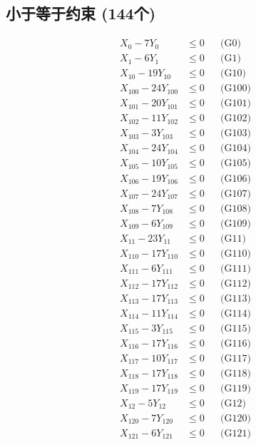 \documentclass[a4paper,10pt]{article}
\begin{document}
\subsection{小于等于约束 (144个)}

\allowdisplaybreaks
{\small\begin{align}
X_{0} - 7Y_{0} &\leq 0 && \text{(G0)} \\
X_{1} - 6Y_{1} &\leq 0 && \text{(G1)} \\
X_{10} - 19Y_{10} &\leq 0 && \text{(G10)} \\
X_{100} - 24Y_{100} &\leq 0 && \text{(G100)} \\
X_{101} - 20Y_{101} &\leq 0 && \text{(G101)} \\
X_{102} - 11Y_{102} &\leq 0 && \text{(G102)} \\
X_{103} - 3Y_{103} &\leq 0 && \text{(G103)} \\
X_{104} - 24Y_{104} &\leq 0 && \text{(G104)} \\
X_{105} - 10Y_{105} &\leq 0 && \text{(G105)} \\
X_{106} - 19Y_{106} &\leq 0 && \text{(G106)} \\
X_{107} - 24Y_{107} &\leq 0 && \text{(G107)} \\
X_{108} - 7Y_{108} &\leq 0 && \text{(G108)} \\
X_{109} - 6Y_{109} &\leq 0 && \text{(G109)} \\
X_{11} - 23Y_{11} &\leq 0 && \text{(G11)} \\
X_{110} - 17Y_{110} &\leq 0 && \text{(G110)} \\
X_{111} - 6Y_{111} &\leq 0 && \text{(G111)} \\
X_{112} - 17Y_{112} &\leq 0 && \text{(G112)} \\
X_{113} - 17Y_{113} &\leq 0 && \text{(G113)} \\
X_{114} - 11Y_{114} &\leq 0 && \text{(G114)} \\
X_{115} - 3Y_{115} &\leq 0 && \text{(G115)} \\
\allowbreak
X_{116} - 17Y_{116} &\leq 0 && \text{(G116)} \\
X_{117} - 10Y_{117} &\leq 0 && \text{(G117)} \\
X_{118} - 17Y_{118} &\leq 0 && \text{(G118)} \\
X_{119} - 17Y_{119} &\leq 0 && \text{(G119)} \\
X_{12} - 5Y_{12} &\leq 0 && \text{(G12)} \\
X_{120} - 7Y_{120} &\leq 0 && \text{(G120)} \\
X_{121} - 6Y_{121} &\leq 0 && \text{(G121)} \\

\end{align}}
\end{document}
